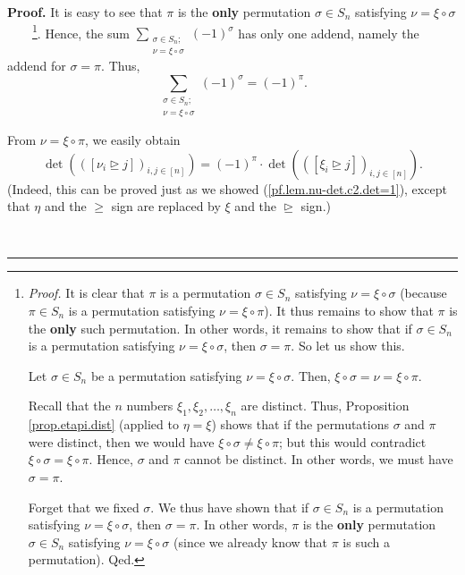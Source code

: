 \documentclass[numbers=enddot,12pt,final,onecolumn,notitlepage,english]{scrartcl}%
\theoremstyle{definition}
\newenvironment{proof}[1][Proof]{\noindent\textbf{#1.} }{\ \rule{0.5em}{0.5em}}
\let\sumnonlimits\sum
\renewcommand{\sum}{\sumnonlimits\limits}
\newenvironment{verlong}{}{}
\newenvironment{vershort}{}{}
\begin{document}
\begin{proof}
\begin{verlong}
It is easy to see that $\pi$ is the \textbf{only} permutation $\sigma\in
S_{n}$ satisfying $\nu=\xi\circ\sigma$\ \ \ \ \footnote{\textit{Proof.} It is
clear that $\pi$ is a permutation $\sigma\in S_{n}$ satisfying $\nu=\xi
\circ\sigma$ (because $\pi\in S_{n}$ is a permutation satisfying $\nu=\xi
\circ\pi$). It thus remains to show that $\pi$ is the \textbf{only} such
permutation. In other words, it remains to show that if $\sigma\in S_{n}$ is a
permutation satisfying $\nu=\xi\circ\sigma$, then $\sigma=\pi$. So let us show
this.
\par
Let $\sigma\in S_{n}$ be a permutation satisfying $\nu=\xi\circ\sigma$. Then,
$\xi\circ\sigma=\nu=\xi\circ\pi$.
\par
Recall that the $n$ numbers $\xi_{1},\xi_{2},\ldots,\xi_{n}$ are distinct.
Thus, Proposition \ref{prop.etapi.dist} (applied to $\eta=\xi$) shows that if
the permutations $\sigma$ and $\pi$ were distinct, then we would have
$\xi\circ\sigma\neq\xi\circ\pi$; but this would contradict $\xi\circ\sigma
=\xi\circ\pi$. Hence, $\sigma$ and $\pi$ cannot be distinct. In other words,
we must have $\sigma=\pi$.
\par
Forget that we fixed $\sigma$. We thus have shown that if $\sigma\in S_{n}$ is
a permutation satisfying $\nu=\xi\circ\sigma$, then $\sigma=\pi$. In other
words, $\pi$ is the \textbf{only} permutation $\sigma\in S_{n}$ satisfying
$\nu=\xi\circ\sigma$ (since we already know that $\pi$ is such a permutation).
Qed.}. Hence, the sum $\sum_{\substack{\sigma\in S_{n};\\\nu=\xi\circ\sigma
}}\left(  -1\right)  ^{\sigma}$ has only one addend, namely the addend for
$\sigma=\pi$. Thus,
\begin{equation}
\sum_{\substack{\sigma\in S_{n};\\\nu=\xi\circ\sigma}}\left(  -1\right)
^{\sigma}=\left(  -1\right)  ^{\pi}. \label{pf.lem.xi-det.c3.sum=}%
\end{equation}

\end{verlong}

\begin{vershort}
From $\nu=\xi\circ\pi$, we easily obtain%
\begin{equation}
\det\left(  \left(  \left[  \nu_{i}\trianglerighteq j\right]  \right)
_{i,j\in\left[  n\right]  }\right)  =\left(  -1\right)  ^{\pi}\cdot\det\left(
\left(  \left[  \xi_{i}\trianglerighteq j\right]  \right)  _{i,j\in\left[
n\right]  }\right)  . \label{pf.lem.xi-det.short.c3.det=1}%
\end{equation}
(Indeed, this can be proved just as we showed (\ref{pf.lem.nu-det.c2.det=1}),
except that $\eta$ and the $\geq$ sign are replaced by $\xi$ and the
$\trianglerighteq$ sign.)
\end{vershort}


\end{proof}
\end{document}
